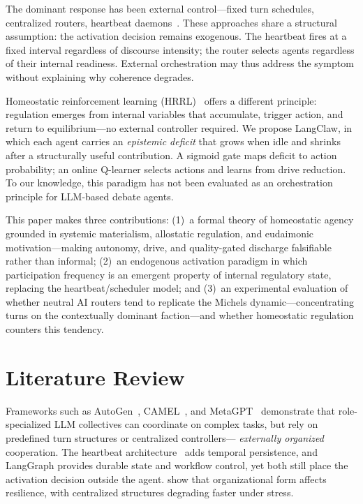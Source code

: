 \documentclass{llncs}
\begin{document}
The dominant response has been external control---fixed turn schedules,
centralized routers, heartbeat daemons~\parencite{openclaw2026heartbeat}.
These approaches share a structural assumption: the activation decision
remains exogenous. The heartbeat fires at a fixed interval regardless of
discourse intensity; the router selects agents regardless of their internal
readiness. External orchestration may thus address the symptom without
explaining why coherence degrades.

Homeostatic reinforcement learning (HRRL)~\parencite{keramati2014homeostatic}
offers a different principle: regulation emerges from internal variables
that accumulate, trigger action, and return to equilibrium---no external
controller required. We propose LangClaw, in which each agent carries an
\emph{epistemic deficit} that grows when idle and shrinks after a
structurally useful contribution. A sigmoid gate maps deficit to action
probability; an online Q-learner selects actions and learns from drive
reduction. To our knowledge, this paradigm has not been evaluated as an
orchestration principle for LLM-based debate agents.

This paper makes three contributions: (1)~a formal theory of homeostatic
agency grounded in systemic materialism, allostatic regulation, and
eudaimonic motivation---making autonomy, drive, and quality-gated discharge
falsifiable rather than informal; (2)~an endogenous activation paradigm in
which participation frequency is an emergent property of internal
regulatory state, replacing the heartbeat/scheduler model; and (3)~an
experimental evaluation of whether neutral AI routers tend to replicate the
Michels dynamic---concentrating turns on the contextually dominant
faction---and whether homeostatic regulation counters this tendency.


\section{Literature Review}
\label{sec:related}

Frameworks such as AutoGen~\parencite{wu2023autogen},
CAMEL~\parencite{li2023camel}, and MetaGPT~\parencite{hong2023metagpt}
demonstrate that role-specialized LLM collectives can coordinate on complex
tasks, but rely on predefined turn structures or centralized controllers---
\emph{externally organized} cooperation. The heartbeat
architecture~\parencite{openclaw2026heartbeat} adds temporal persistence, and
LangGraph provides durable state and workflow control, yet both still place
the activation decision outside the agent.
\textcite{huang2024masresilience} show that organizational form affects
resilience, with centralized structures degrading faster under stress.
\end{document}
